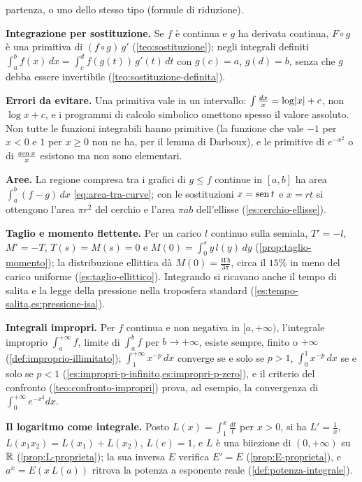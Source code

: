 \begin{puntichiave}
partenza, o uno dello stesso tipo (formule di riduzione).
\item \textbf{Integrazione per sostituzione.} Se $f$ è continua e $g$ ha derivata
continua, $F\circ g$ è una primitiva di $(f\circ g)\,g'$ (\cref{teo:sostituzione}); negli
integrali definiti $\int_{a}^{b}f(x)\,dx=\int_{c}^{d}f(g(t))\,g'(t)\,dt$ con $g(c)=a$,
$g(d)=b$, senza che $g$ debba essere invertibile (\cref{teo:sostituzione-definita}).
\item \textbf{Errori da evitare.} Una primitiva vale in un intervallo: $\int\frac{dx}x
=\log\lvert x\rvert+c$, non $\log x+c$, e i programmi di calcolo simbolico omettono spesso il valore
assoluto. Non tutte le funzioni integrabili hanno primitive (la funzione che vale $-1$ per
$x<0$ e $1$ per $x\ge0$ non ne ha, per il lemma di Darboux), e le primitive di $e^{-x^{2}}$ o
di $\frac{\operatorname{sen} x}x$ esistono ma non sono elementari.
\item \textbf{Aree.} La regione compresa tra i grafici di $g\le f$ continue in $[a,b]$ ha
area $\int_{a}^{b}(f-g)\,dx$ \eqref{eq:area-tra-curve}; con le sostituzioni $x=\operatorname{sen} t$ e
$x=rt$ si ottengono l'area $\pi r^{2}$ del cerchio e l'area $\pi ab$ dell'ellisse
(\cref{es:cerchio-ellisse}).
\item \textbf{Taglio e momento flettente.} Per un carico $l$ continuo sulla semiala,
$T'=-l$, $M'=-T$, $T(s)=M(s)=0$ e $M(0)=\int_{0}^{s}y\,l(y)\,dy$
(\cref{prop:taglio-momento}); la distribuzione ellittica dà $M(0)=\frac{Wb}{3\pi}$, circa il
$15\%$ in meno del carico uniforme (\cref{es:taglio-ellittico}). Integrando si ricavano
anche il tempo di salita e la legge della pressione nella troposfera standard
(\cref{es:tempo-salita,es:pressione-isa}).
\item \textbf{Integrali impropri.} Per $f$ continua e non negativa in $[a,+\infty)$,
l'integrale improprio $\int_{a}^{+\infty}f$, limite di $\int_{a}^{b}f$ per $b\to+\infty$, esiste
sempre, finito o $+\infty$ (\cref{def:improprio-illimitato}); $\int_{1}^{+\infty}x^{-p}\,dx$ converge se e solo se
$p>1$, $\int_{0}^{1}x^{-p}\,dx$ se e solo se $p<1$
(\cref{es:impropri-p-infinito,es:impropri-p-zero}), e il criterio del confronto
(\cref{teo:confronto-impropri}) prova, ad esempio, la convergenza di
$\int_{0}^{+\infty}e^{-x^{2}}dx$.
\item \textbf{Il logaritmo come integrale.} Posto $L(x)=\int_{1}^{x}\frac{dt}t$ per $x>0$,
si ha $L'=\frac1x$, $L(x_{1}x_{2})=L(x_{1})+L(x_{2})$, $L(e)=1$, e $L$ è una biiezione di
$(0,+\infty)$ su $\mathbb{R}$ (\cref{prop:L-proprieta}); la sua inversa $E$ verifica $E'=E$
(\cref{prop:E-proprieta}), e $a^{x}=E(x\,L(a))$ ritrova la potenza a esponente reale
(\cref{def:potenza-integrale}).
\end{puntichiave}

